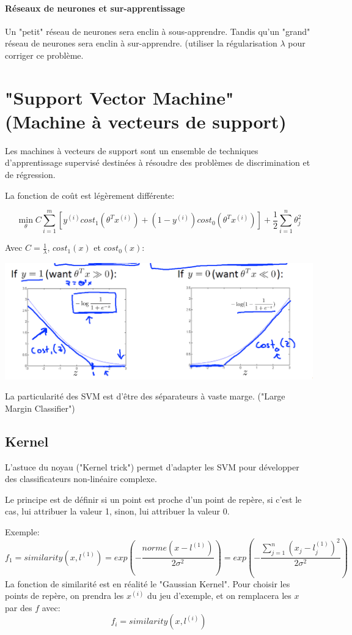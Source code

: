 \documentclass{article}
\theoremstyle{definition}
\begin{document}
\paragraph{Réseaux de neurones et sur-apprentissage}
Un "petit" réseau de neurones sera enclin à sous-apprendre. Tandis qu'un "grand" réseau de neurones sera enclin à sur-apprendre. (utiliser la régularisation $\lambda$ pour corriger ce problème.
\newpage
\section{"Support Vector Machine" (Machine à vecteurs de support)}
Les machines à vecteurs de support sont un ensemble de techniques d'apprentissage supervisé destinées à résoudre des problèmes de discrimination et de régression.\par
La fonction de coût est légèrement différente:
\begin{center}
$$\min_\theta C\sum_{i=1}^{m}[y^{(i)}cost_1(\theta^{T}x^{(i)})+(1-y^{(i)})cost_0(\theta^Tx^{(i)})]+ \frac{1}{2}\sum_{i=1}^{n}\theta_j^2$$
\end{center}
Avec $C=\frac{1}{\lambda}$, $cost_1(x)$ et $cost_0(x)$:
\begin{center}
\includegraphics[scale=0.3]{svm}
\end{center}
La particularité des SVM est d'être des séparateurs à vaste marge. ("Large Margin Classifier")\par
\subsection{Kernel}
L'astuce du noyau ("Kernel trick") permet d'adapter les SVM pour développer des classificateurs non-linéaire complexe.\par
Le principe est de définir si un point est proche d'un point de repère, si c'est le cas, lui attribuer la valeur 1, sinon, lui attribuer la valeur 0.\par
Exemple:
$$ f_1=similarity(x,l^{(1)})=exp(-\frac{norme(x-l^{(1)})}{2\sigma^2}) = exp(-\frac{\sum_{j=1}^{n}(x_j-l_j^{(1)})^2}{2\sigma^2})$$
La fonction de similarité est en réalité le "Gaussian Kernel".
Pour choisir les points de repère, on prendra les $x^{(i)}$ du jeu d'exemple, et on remplacera les $x$ par des $f$ avec:
$$f_i=similarity(x,l^{(i)})$$
\end{document}
